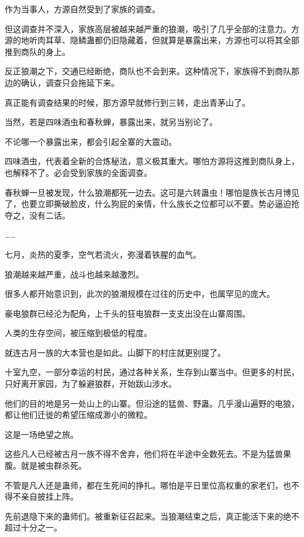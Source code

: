 
\begin{this_body}

作为当事人，方源自然受到了家族的调查。

但这调查并不深入，家族高层被越来越严重的狼潮，吸引了几乎全部的注意力。方源的地听肉耳草、隐鳞蛊都仍旧隐藏着，但就算是暴露出来，方源也可以将其全部推到商队的身上。

反正狼潮之下，交通已经断绝，商队也不会到来。这种情况下，家族得不到商队那边的确认，调查只会拖延下来。

真正能有调查结果的时候，那方源早就修行到三转，走出青茅山了。

当然，若是四味酒虫和春秋蝉，暴露出来，就另当别论了。

不论哪一个暴露出来，都会引起全寨的大震动。

四味酒虫，代表着全新的合炼秘法，意义极其重大。哪怕方源将这推到商队身上，也解释不了。必会受到家族的全面调查。

春秋蝉一旦被发现，什么狼潮都死一边去。这可是六转蛊虫！哪怕是族长古月博见了，也要立即撕破脸皮，什么狗屁的亲情，什么族长之位都可以不要。势必逼迫抢夺之，没有二话。

……

七月，炎热的夏季，空气若流火，弥漫着铁腥的血气。

狼潮越来越严重，战斗也越来越激烈。

很多人都开始意识到，此次的狼潮规模在过往的历史中，也属罕见的庞大。

豪电狼群已经沦为配角，上千头的狂电狼群一支支出没在山寨周围。

人类的生存空间，被压缩到极低的程度。

就连古月一族的大本营也是如此。山脚下的村庄就更别提了。

十室九空，一部分幸运的村民，通过各种关系，生存到山寨当中。但更多的村民，只好离开家园，为了躲避狼群，开始跋山涉水。

他们的目的地是另一处山上的山寨。但沿途的猛兽、野蛊。几乎漫山遍野的电狼，都让他们迁徙的希望压缩成渺小的微粒。

这是一场绝望之旅。

这些凡人已经被古月一族不得不舍弃，他们将在半途中全数死去。不是为猛兽果腹。就是被虫群杀死。

不管是凡人还是蛊师，都在生死间的挣扎。哪怕是平日里位高权重的家老们，也不得不亲自披挂上阵。

先前退隐下来的蛊师们。被重新征召起来。当狼潮结束之后，真正能活下来的绝不超过十分之一。


\end{this_body}
